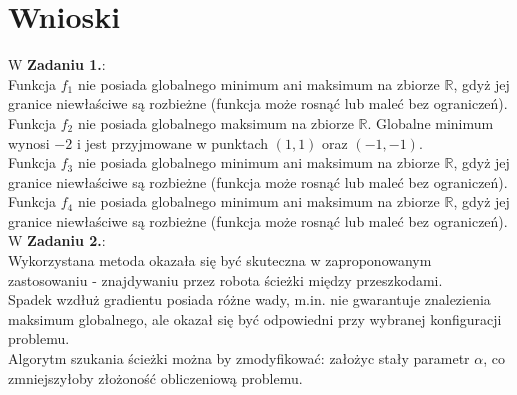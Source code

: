 \documentclass{article}
\begin{document}
\section*{Wnioski}
\null\quad
W \textbf{Zadaniu 1.}: \\
Funkcja $f_1$ nie posiada globalnego minimum ani maksimum na zbiorze $\mathbb{R}$,
gdyż jej granice niewłaściwe są rozbieżne (funkcja może rosnąć lub maleć bez ograniczeń). \\
Funkcja $f_2$ nie posiada globalnego maksimum na zbiorze $\mathbb{R}$. Globalne minimum wynosi $-2$ i 
jest przyjmowane w punktach $(1, 1)$ oraz $(-1, -1)$. \\
Funkcja $f_3$ nie posiada globalnego minimum ani maksimum na zbiorze $\mathbb{R}$,
gdyż jej granice niewłaściwe są rozbieżne (funkcja może rosnąć lub maleć bez ograniczeń). \\
Funkcja $f_4$ nie posiada globalnego minimum ani maksimum na zbiorze $\mathbb{R}$,
gdyż jej granice niewłaściwe są rozbieżne (funkcja może rosnąć lub maleć bez ograniczeń). \\
\null\quad
W \textbf{Zadaniu 2.}: \\
Wykorzystana metoda okazała się być skuteczna w zaproponowanym zastosowaniu - znajdywaniu przez robota
ścieżki między przeszkodami. \\
Spadek wzdłuż gradientu posiada różne wady, m.in. nie gwarantuje znalezienia maksimum globalnego, ale
okazał się być odpowiedni przy wybranej konfiguracji problemu. \\
Algorytm szukania ścieżki można by zmodyfikować: założyc stały parametr $\alpha$, co zmniejszyłoby
złożoność obliczeniową problemu.
\end{document}
